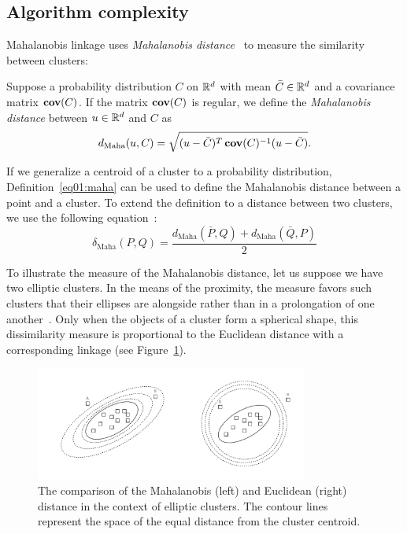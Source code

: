 \subsection{Algorithm complexity}

Mahalanobis linkage uses \emph{Mahalanobis distance}~\cite{mahalanobis1936generalized} to measure the similarity between clusters:
\begin{defn}
    Suppose a probability distribution $C$ on $\mathbb{R}^d$ with mean $\bar{C} \in \mathbb{R}^d$ and a covariance matrix $\operatorname{\textbf{cov}}(C)$. If the matrix $\operatorname{\textbf{cov}}(C)$ is regular, we define the \emph{Mahalanobis distance} between $u \in \mathbb{R}^d$ and $C$ as
    \begin{equation}
    d_\text{Maha}(u,C) = \sqrt{(u-\bar{C})^T\operatorname{\textbf{cov}}(C)^{-1}(u-\bar{C})}.
    \end{equation}\label{eq01:maha}
\end{defn}

If we generalize a centroid of a cluster to a probability distribution, Definition~\ref{eq01:maha} can be used to define the Mahalanobis distance between a point and a cluster. To extend the definition to a distance between two clusters, we use the following equation~\cite{fivser2012detection}:
\begin{equation}
    \delta_\text{Maha}(P,Q) = \frac{d_\text{Maha}(\bar{P},Q) + d_\text{Maha}(\bar{Q},P)}{2}
\end{equation}\label{eq01:maha_linkage}

To illustrate the measure of the Mahalanobis distance, let us suppose we have two elliptic clusters. In the means of the proximity, the measure favors such clusters that their ellipses are alongside rather than in a prolongation of one another~\cite{dagnelie1991using}.
Only when the objects of a cluster form a spherical shape, this dissimilarity measure is proportional to the Euclidean distance with a corresponding linkage (see Figure~\ref{fig:ellipses}).

\begin{figure}[h]
    \centering
    \includegraphics[width=0.8\textwidth]{img/maha.drawio.pdf}
    \caption{The comparison of the Mahalanobis (left) and Euclidean (right) distance in the context of elliptic clusters. The contour lines represent the space of the equal distance from the cluster centroid.}
    \label{fig:ellipses}
\end{figure}

